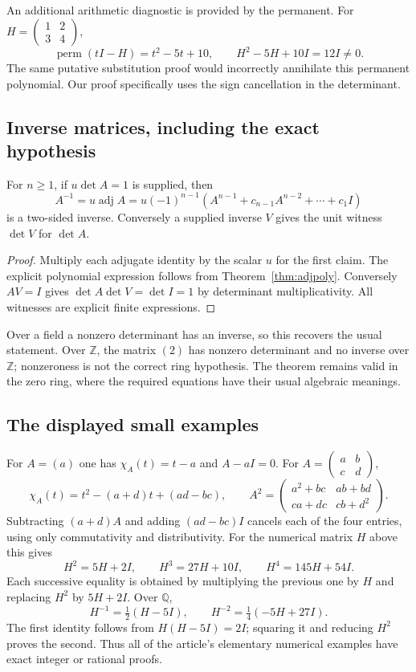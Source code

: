 An additional arithmetic diagnostic is provided by the permanent. For
$H=\left(\begin{smallmatrix}1&2\\3&4\end{smallmatrix}\right)$,
\[
 \operatorname{perm}(tI-H)=t^2-5t+10,
 \qquad H^2-5H+10I=12I\ne0.
\]
The same putative substitution proof would incorrectly annihilate this
permanent polynomial. Our proof specifically uses the sign cancellation
in the determinant.

\subsection{Inverse matrices, including the exact hypothesis}

\begin{theorem}
\label{thm:inverse}
For $n\ge1$, if $u\det A=1$ is supplied, then
\[
 A^{-1}=u\operatorname{adj}A
       =u(-1)^{n-1}
                (A^{n-1}+c_{n-1}A^{n-2}+\cdots+c_1I)
\]
is a two-sided inverse. Conversely a supplied inverse $V$ gives the
unit witness $\det V$ for $\det A$.
\end{theorem}
\begin{proof}
Multiply each adjugate identity by the scalar $u$ for the first claim.
The explicit polynomial expression follows from
Theorem~\ref{thm:adjpoly}. Conversely $AV=I$ gives
$\det A\det V=\det I=1$ by determinant multiplicativity. All witnesses
are explicit finite expressions.
\end{proof}
Over a field a nonzero determinant has an inverse, so this recovers the
usual statement. Over $\mathbb Z$, the matrix $(2)$ has nonzero
determinant and no inverse over $\mathbb Z$; nonzeroness is not the
correct ring hypothesis. The theorem remains valid in the zero ring,
where the required equations have their usual algebraic meanings.

\subsection{The displayed small examples}

For $A=(a)$ one has $\chi_A(t)=t-a$ and $A-aI=0$. For
$A=\left(\begin{smallmatrix}a&b\\c&d\end{smallmatrix}\right)$,
\[
 \chi_A(t)=t^2-(a+d)t+(ad-bc),\qquad
 A^2=\begin{pmatrix}a^2+bc&ab+bd\\ca+dc&cb+d^2\end{pmatrix}.
\]
Subtracting $(a+d)A$ and adding $(ad-bc)I$ cancels each of the four
entries, using only commutativity and distributivity.
For the numerical matrix $H$ above this gives
\[
 H^2=5H+2I,\qquad H^3=27H+10I,\qquad H^4=145H+54I.
\]
Each successive equality is obtained by multiplying the previous one
by $H$ and replacing $H^2$ by $5H+2I$. Over $\mathbb Q$,
\[
 H^{-1}=\tfrac12(H-5I),\qquad
 H^{-2}=\tfrac14(-5H+27I).
\]
The first identity follows from $H(H-5I)=2I$; squaring it and reducing
$H^2$ proves the second. Thus all of the article's elementary numerical
examples have exact integer or rational proofs.

